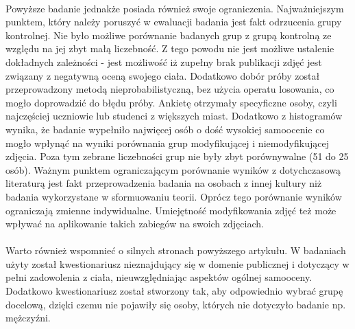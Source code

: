 \documentclass[12pt,a4paper,final,oneside,onecolumn,titlepage]{article}
\begin{document}
\paragraph{}
Powyższe badanie jednakże posiada również swoje ograniczenia. Najważniejszym punktem, który należy poruszyć w ewaluacji badania jest fakt odrzucenia grupy kontrolnej. Nie było możliwe porównanie badanych grup z grupą kontrolną ze względu na jej zbyt małą liczebność. Z tego powodu nie jest możliwe ustalenie dokładnych zależności - jest możliwość iż zupełny brak publikacji zdjęć jest związany z negatywną oceną swojego ciała. Dodatkowo dobór próby został przeprowadzony metodą nieprobabilistyczną, bez użycia operatu losowania, co mogło doprowadzić do błędu próby. Ankietę otrzymały specyficzne osoby, czyli najczęściej uczniowie lub studenci z większych miast. Dodatkowo z histogramów wynika, że badanie wypełniło najwięcej osób o dość wysokiej samoocenie co mogło wpłynąć na wyniki porównania grup modyfikującej i niemodyfikującej zdjęcia. Poza tym zebrane liczebności grup nie były zbyt porównywalne (51 do 25 osób). Ważnym punktem ograniczającym porównanie wyników z dotychczasową literaturą jest fakt przeprowadzenia badania na osobach z innej kultury niż badania wykorzystane w sformuowaniu teorii. Oprócz tego porównanie wyników ograniczają zmienne indywidualne. Umiejętność modyfikowania zdjęć też może wpływać na aplikowanie takich zabiegów na swoich zdjęciach.
\paragraph{}
Warto również wspomnieć o silnych stronach powyższego artykułu. W badaniach użyty został kwestionariusz nieznajdujący się w domenie publicznej i dotyczący w pełni zadowolenia z ciała, nieuwzględniając aspektów ogólnej samooceny. Dodatkowo kwestionariusz został stworzony tak, aby odpowiednio wybrać grupę docelową, dzięki czemu nie pojawiły się osoby, których nie dotyczyło badanie np. mężczyźni.
\newpage

\end{document}
